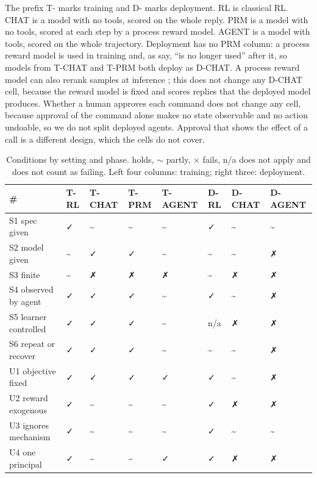 \documentclass{article}
\begin{document}
The prefix T- marks training and D- marks deployment. RL is classical RL. CHAT is a model with no tools, scored on the whole reply. PRM is a model with no tools, scored at each step by a process reward model. AGENT is a model with tools, scored on the whole trajectory. Deployment has no PRM column: a process reward model is used in training and, as \citet[§4]{mclean2026} say, ``is no longer used'' after it, so models from T-CHAT and T-PRM both deploy as D-CHAT. A process reward model can also rerank samples at inference \citep{zhang2025}; this does not change any D-CHAT cell, because the reward model is fixed and scores replies that the deployed model produces. Whether a human approves each command does not change any cell, because approval of the command alone makes no state observable and no action undoable, so we do not split deployed agents. Approval that shows the effect of a call is a different design, which the cells do not cover.

\begin{table}[!htb]
\centering\small\setlength{\tabcolsep}{3pt}
\caption{Conditions by setting and phase. \checkmark{} holds, $\sim$ partly, $\times$ fails, n/a does not apply and does not count as failing. Left four columns: training; right three: deployment.}\label{tab:setting_conditions}
\begin{tabularx}{\textwidth}{@{}>{\raggedright\arraybackslash}Xlllllll@{}}
\toprule
\# & T-RL & T-CHAT & T-PRM & T-AGENT & D-RL & D-CHAT & D-AGENT \\
\midrule
S1 spec given & ✓ & \textasciitilde{} & \textasciitilde{} & \textasciitilde{} & ✓ & \textasciitilde{} & \textasciitilde{} \\
S2 model given & \textasciitilde{} & ✓ & ✓ & \textasciitilde{} & \textasciitilde{} & \textasciitilde{} & ✗ \\
S3 finite & \textasciitilde{} & ✗ & ✗ & ✗ & \textasciitilde{} & ✗ & ✗ \\
S4 observed by agent & ✓ & ✓ & ✓ & \textasciitilde{} & ✓ & \textasciitilde{} & ✗ \\
S5 learner controlled & ✓ & ✓ & ✓ & \textasciitilde{} & n/a & ✗ & ✗ \\
S6 repeat or recover & ✓ & ✓ & ✓ & \textasciitilde{} & \textasciitilde{} & \textasciitilde{} & ✗ \\
U1 objective fixed & ✓ & ✓ & ✓ & ✓ & ✓ & \textasciitilde{} & ✗ \\
U2 reward exogenous & ✓ & \textasciitilde{} & \textasciitilde{} & \textasciitilde{} & ✓ & ✗ & ✗ \\
U3 ignores mechanism & ✓ & \textasciitilde{} & \textasciitilde{} & \textasciitilde{} & ✓ & \textasciitilde{} & \textasciitilde{} \\
U4 one principal & ✓ & \textasciitilde{} & \textasciitilde{} & ✓ & ✓ & ✗ & ✗ \\
\bottomrule
\end{tabularx}
\end{table}
\end{document}
